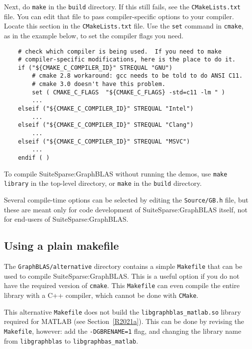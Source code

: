 \documentclass[12pt]{article}
\begin{document}
Next, do \verb'make' in the \verb'build' directory.  If this still fails, see
the \verb'CMakeLists.txt' file.  You can edit that file to pass
compiler-specific options to your compiler.  Locate this section in the
\verb'CMakeLists.txt' file.  Use the \verb'set' command in \verb'cmake', as in
the example below, to set the compiler flags you need.

    {\small
    \begin{verbatim}
    # check which compiler is being used.  If you need to make
    # compiler-specific modifications, here is the place to do it.
    if ("${CMAKE_C_COMPILER_ID}" STREQUAL "GNU")
        # cmake 2.8 workaround: gcc needs to be told to do ANSI C11.
        # cmake 3.0 doesn't have this problem.
        set ( CMAKE_C_FLAGS  "${CMAKE_C_FLAGS} -std=c11 -lm " )
        ...
    elseif ("${CMAKE_C_COMPILER_ID}" STREQUAL "Intel")
        ...
    elseif ("${CMAKE_C_COMPILER_ID}" STREQUAL "Clang")
        ...
    elseif ("${CMAKE_C_COMPILER_ID}" STREQUAL "MSVC")
        ...
    endif ( )
    \end{verbatim} }

To compile SuiteSparse:GraphBLAS without running the demos, use \newline
\verb'make library' in the top-level directory, or \verb'make' in the
\verb'build' directory.

Several compile-time options can be selected by editing the \verb'Source/GB.h'
file, but these are meant only for code development of SuiteSparse:GraphBLAS
itself, not for end-users of SuiteSparse:GraphBLAS.

\subsection{Using a plain makefile}
\label{altmake}

The \verb'GraphBLAS/alternative' directory contains a simple \verb'Makefile'
that can be used to compile SuiteSparse:GraphBLAS.  This is a useful option
if you do not have the required version of \verb'cmake'.  This \verb'Makefile'
can even compile the entire library with a C++ compiler, which cannot be
done with \verb'CMake'.

This alternative \verb'Makefile' does not build the
\verb'libgraphblas_matlab.so' library required for MATLAB (see
Section~\ref{R2021a}).  This can be done by revising the \verb'Makefile',
however:  add the \verb'-DGBRENAME=1' flag, and changing the library name
from \verb'libgraphblas' to \verb'libgraphbas_matlab'.
\end{document}
